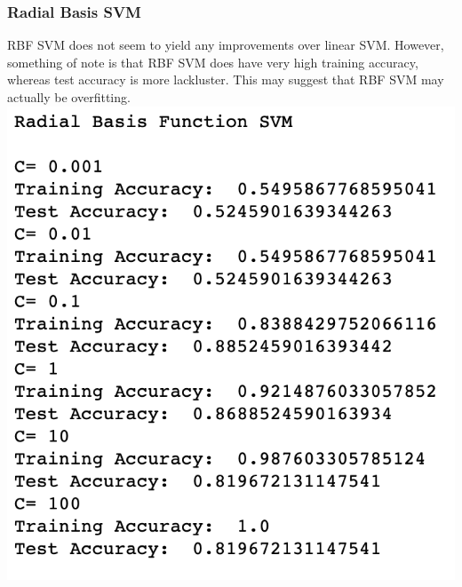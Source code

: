 \documentclass[11pt, oneside]{article}
\begin{document}
\subsubsection *{Radial Basis SVM}
RBF SVM does not seem to yield any improvements over linear SVM. However, something of note is that RBF SVM does have very high training accuracy, whereas test accuracy is more lackluster. This may suggest that RBF SVM may actually be overfitting.
\includegraphics{5}\\
\end{document}
